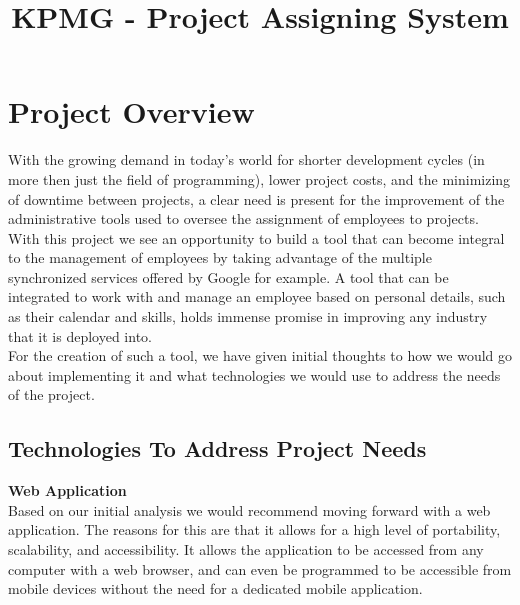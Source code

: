 \documentclass[12pt]{article}
\title{KPMG - Project Assigning System}
\begin{document}
    \newcommand{\titleimage}{kpmg.png}
    \newcommand{\titlecompany}{KPMG}
    
    
    
	
	\newpage

	\section{Project Overview}
	
	With the growing demand in today's world for shorter development cycles (in more then just the field of programming), lower project costs, and the minimizing of downtime between projects, a clear need is present for the improvement of the administrative tools used to oversee the assignment of employees to projects. With this project we see an opportunity to build a tool that can become integral to the management of employees by taking advantage of the multiple synchronized services offered by Google for example. A tool that can be integrated to work with and manage an employee based on personal details, such as their calendar and skills, holds immense promise in improving any industry that it is deployed into.\\
	
	For the creation of such a tool, we have given initial thoughts to how we would go about implementing it and what technologies we would use to address the needs of the project.
	
	\subsection*{Technologies To Address Project Needs}
	\textbf{Web Application}\\
	Based on our initial analysis we would recommend moving forward with a web application. The reasons for this are that it allows for a high level of portability, scalability, and accessibility. It allows the application to be accessed from any computer with a web browser, and can even be programmed to be accessible from mobile devices without the need for a dedicated mobile application.\\
		
\end{document}
